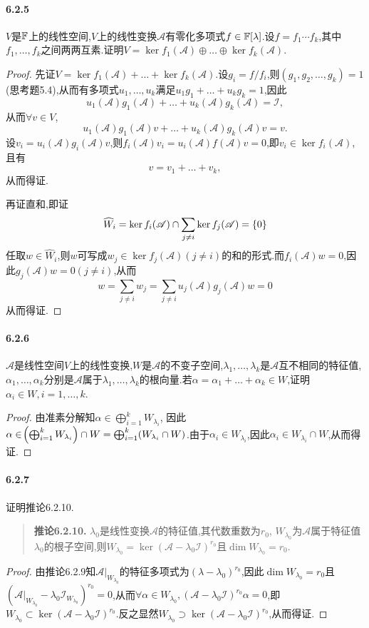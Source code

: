 \documentclass[11pt]{article}
\begin{document}
\paragraph{6.2.5}$V$是$\mathbb{F}$上的线性空间,$V$上的线性变换$\mathscr{A}$有零化多项式$f\in \mathbb{F}[\lambda]$.设$f=f_1 \cdots f_k$,其中$f_1,\dots,f_k$之间两两互素.证明$V=\ker f_1(\mathscr{A})\oplus\dots\oplus\ker f_k(\mathscr{A})$.
\begin{proof}
    先证$V=\ker f_1(\mathscr{A})+\dots+\ker f_k(\mathscr{A})$.设$g_i=f/f_i$,则$(g_1,g_2,\dots,g_k)=1$(思考题5.4),从而有多项式$u_1,\dots,u_k$满足$u_1g_1+\dots+u_kg_k=1$,因此
    $$u_1(\mathscr{A})g_1(\mathscr{A})+\dots+u_k(\mathscr{A})g_k(\mathscr{A})=\mathscr{I},$$
    从而$\forall v\in V$, 
    $$u_1(\mathscr{A})g_1(\mathscr{A})v+\dots+u_k(\mathscr{A})g_k(\mathscr{A})v=v.$$
    设$v_i=u_i(\mathscr{A})g_i(\mathscr{A})v$,则$f_i(\mathscr{A})v_i=u_i(\mathscr{A})f(\mathscr{A})v=0$,即$v_i\in \ker f_i(\mathscr{A})$,且有
    $$v=v_1+\dots+v_k,$$
    从而得证.

    再证直和,即证
    $$\widehat{W}_i=\ker f_i(\mathscr{A})\cap \sum_{j\neq i} \ker f_j(\mathscr{A}) = \left\{0\right\}$$
    任取$w\in \widehat{W}_i$,则$w$可写成$w_j\in \ker f_j(\mathscr{A}) (j\neq i)$的和的形式.而$f_i(\mathscr{A})w=0$,因此$g_j(\mathscr{A})w=0 (j\neq i)$,从而
    $$w=\sum_{j\neq i}w_j=\sum_{j\neq i}u_j(\mathscr{A})g_j(\mathscr{A})w=0$$
    从而得证.
\end{proof}
\paragraph{6.2.6}$\mathscr{A}$是线性空间$V$上的线性变换,$W$是$\mathscr{A}$的不变子空间,$\lambda_1,\dots,\lambda_k$是$\mathscr{A}$互不相同的特征值,$\alpha_1,\dots,\alpha_k$分别是$\mathscr{A}$属于$\lambda_1,\dots,\lambda_k$的根向量.若$\alpha=\alpha_1+\dots+\alpha_k\in W$,证明$\alpha_i\in W, i=1,\dots,k$.
\begin{proof}
    由准素分解知$\alpha\in \bigoplus_{i=1}^k W_{\lambda_i}$, 因此$\alpha\in \!\left(\bigoplus_{i=1}^k W_{\lambda_i}\right)\cap W=\bigoplus_{i=1}^k (W_{\lambda_i}\cap W)$.由于$\alpha_i\in W_{\lambda_i}$,因此$\alpha_i\in W_{\lambda_i}\cap W$,从而得证.
\end{proof}
\paragraph{6.2.7}证明推论6.2.10.
\begin{quotation}
    \textbf{推论6.2.10.} $\lambda_0$是线性变换$\mathscr{A}$的特征值,其代数重数为$r_0$, $W_{\lambda_0}$为$\mathscr{A}$属于特征值$\lambda_0$的根子空间,则$W_{\lambda_0}=\ker (\mathscr{A}-\lambda_0\mathscr{I})^{r_0}$且$\dim W_{\lambda_0}=r_0$.
\end{quotation}
\begin{proof}
    由推论6.2.9知$\mathscr{A}|_{W_{\lambda_0}}$的特征多项式为$(\lambda-\lambda_0)^{r_0}$,因此$\dim W_{\lambda_0}=r_0$且$(\mathscr{A}|_{W_{\lambda_0}}-\lambda_0\mathscr{I}_{W_{\lambda_0}})^{r_0}=0$,从而$\forall \alpha\in W_{\lambda_0}, (\mathscr{A}-\lambda_0\mathscr{I})^{r_0}\alpha=0$,即$W_{\lambda_0}\subset \ker (\mathscr{A}-\lambda_0\mathscr{I})^{r_0}$.反之显然$W_{\lambda_0}\supset \ker (\mathscr{A}-\lambda_0\mathscr{I})^{r_0}$,从而得证.
\end{proof}
\end{document}
